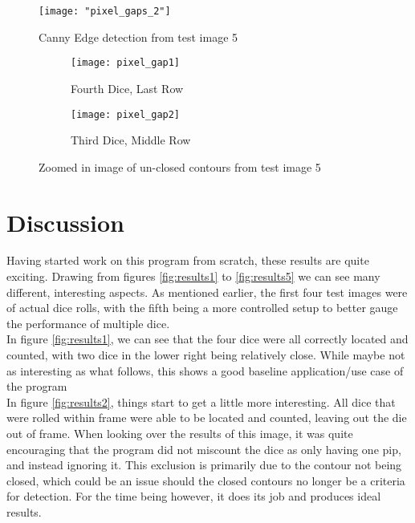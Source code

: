 \documentclass[journal]{IEEEtran}
\begin{document}
\begin{figure}[h]
	\texttt{[image: "pixel\_gaps\_2"]}
	\centering
	\caption{Canny Edge detection from test image 5}
	\label{fig:pixel_gaps_canny}
\end{figure}

\begin{figure}
	\centering
	\begin{subfigure}{.25\textwidth}
		\centering
		\texttt{[image: pixel\_gap1]}
		\caption{Fourth Dice, Last Row}
		\label{fig:pixel_gaps_sub1}
	\end{subfigure}%
	\begin{subfigure}{.25\textwidth}
		\centering
		\texttt{[image: pixel\_gap2]}
		\caption{Third Dice, Middle Row}
		\label{fig:pixel_gaps_sub2}
	\end{subfigure}
	\caption{Zoomed in image of un-closed contours from test image 5}
	\label{fig:pixel_gaps}
\end{figure}



\section{Discussion}
Having started work on this program from scratch, these results are quite exciting. Drawing from figures \ref{fig:results1} to \ref{fig:results5} we can see many different, interesting aspects. As mentioned earlier, the first four test images were of actual dice rolls, with the fifth being a more controlled setup to better gauge the performance of multiple dice.\\

In figure \ref{fig:results1}, we can see that the four dice were all correctly located and counted, with two dice in the lower right being relatively close. While maybe not as interesting as what follows, this shows a good baseline application/use case of the program\\

In figure \ref{fig:results2}, things start to get a little more interesting. All dice that were rolled within frame were able to be located and counted, leaving out the die out of frame. When looking over the results of this image, it was quite encouraging that the program did not miscount the dice as only having one pip, and instead ignoring it. This exclusion is primarily due to the contour not being closed, which could be an issue should the closed contours no longer be a criteria for detection. For the time being however, it does its job and produces ideal results.\\
\end{document}
